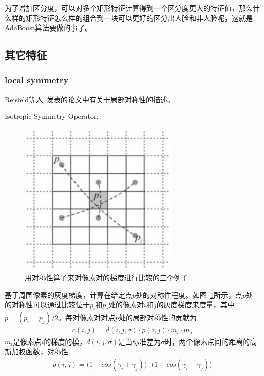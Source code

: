 \documentclass[12pt]{article}
\begin{document}
为了增加区分度，可以对多个矩形特征计算得到一个区分度更大的特征值，那么什么样的矩形特征怎么样的组合到一块可以更好的区分出人脸和非人脸呢，这就是AdaBoost算法要做的事了。

\subsection{其它特征}

\subsubsection{local symmetry}

Reisfeld等人~\cite{reisfeld1995context}发表的论文中有关于局部对称性的描述。

Isotropic Symmetry Operator:

\begin{figure}[!ht]
 \centering
 \includegraphics[width=3in]{ExamplesofPixelpairs}
\caption{用对称性算子来对像素对的梯度进行比较的三个例子}
\label{fig: ExamplesofPixelpairs}
\end{figure}

基于周围像素的灰度梯度，计算在给定点$p$处的对称性程度。如图~\ref{fig: ExamplesofPixelpairs}所示，点$p$处的对称性可以通过比较位于$p_i$和$p_j$处的像素对$i$和$j$的灰度梯度来度量，其中$p = (p_i  = p_j)/2$。每对像素对对点$p$处的局部对称性的贡献为
\begin{align}
c(i, j) = d(i, j, \sigma) \cdot p(i, j) \cdot m_i \cdot m_j
\end{align}
$m_i$是像素点$i$的梯度的模，$d(i, j, \sigma)$是当标准差为$\sigma$时，两个像素点间的距离的高斯加权函数，对称性
\begin{align}
p(i, j) = \Big(1-cos(\gamma_i+\gamma_j)\Big)\cdot \Big(1-cos(\gamma_i-\gamma_j)\Big)
\label{eq: SymmetryMeasurement}
\end{align}
\end{document}
